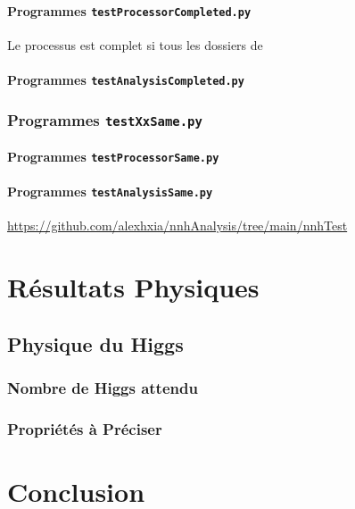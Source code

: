 \documentclass[10pt,a4paper]{report}
\begin{document}
\subsubsection{Programmes \texttt{testProcessorCompleted.py}}

Le processus est complet si tous les dossiers de 

\subsubsection{Programmes \texttt{testAnalysisCompleted.py}}


\subsection{Programmes \texttt{testXxSame.py}}

\subsubsection{Programmes \texttt{testProcessorSame.py}}

\subsubsection{Programmes \texttt{testAnalysisSame.py}}



\url{https://github.com/alexhxia/nnhAnalysis/tree/main/nnhTest}


\chapter{Résultats Physiques}

\section{Physique du Higgs}

\subsection{Nombre de Higgs attendu}

\subsection{Propriétés à Préciser}

\chapter{Conclusion}
\end{document}
